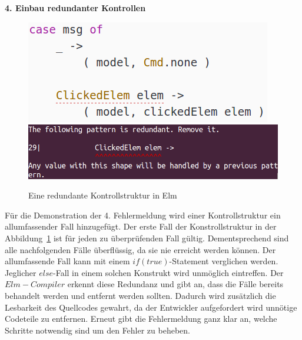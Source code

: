 \textbf{4. Einbau redundanter Kontrollen}\\
\begin{figure}[h!]
\centering
\includegraphics[scale=0.5]{img/redundant-pattern-code.png}
\includegraphics[scale=0.5]{img/redundant-pattern-error.png}
\caption{Eine redundante Kontrollstruktur in Elm}\label{fig:redundant-pattern}
\end{figure}
Für die Demonstration der 4. Fehlermeldung wird einer Kontrollstruktur ein allumfassender Fall hinzugefügt. Der erste Fall der Konstrollstruktur in der Abbildung~\ref{fig:redundant-pattern} ist für jeden zu überprüfenden Fall gültig. Dementsprechend sind alle nachfolgenden Fälle überflüssig, da sie nie erreicht werden können. Der allumfassende Fall kann mit einem $if(true)$-Statement verglichen werden. Jeglicher $else$-Fall in einem solchen Konstrukt wird unmöglich eintreffen. Der $Elm-Compiler$ erkennt diese Redundanz und gibt an, dass die Fälle bereits behandelt werden und entfernt werden sollten. Dadurch wird zusätzlich die Lesbarkeit des Quellcodes gewahrt, da der Entwickler aufgefordert wird unnötige Codeteile zu entfernen. Erneut gibt die Fehlermeldung ganz klar an, welche Schritte notwendig sind um den Fehler zu beheben.
\\


